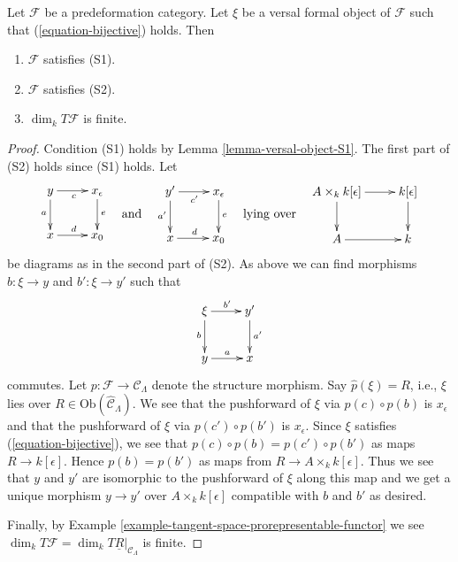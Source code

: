 \begin{lemma}
\label{lemma-miniversal-object-existence-1}
Let $\mathcal{F}$ be a predeformation category.
Let $\xi$ be a versal formal object of $\mathcal{F}$ such that
(\ref{equation-bijective}) holds. Then
\begin{enumerate}
\item $\mathcal{F}$ satisfies (S1).
\item $\mathcal{F}$ satisfies (S2).
\item $\dim_{k} T\mathcal{F}$ is finite.
\end{enumerate}
\end{lemma}

\begin{proof}
Condition (S1) holds by
Lemma \ref{lemma-versal-object-S1}.
The first part of (S2) holds since (S1) holds. Let
$$
\vcenter{
\xymatrix{
y \ar[r]_c \ar[d]_a & x_\epsilon \ar[d]^e \\
x \ar[r]^d          & x_0
}
}
\quad\text{and}\quad
\vcenter{
\xymatrix{
y' \ar[r]_{c'} \ar[d]_{a'} & x_\epsilon \ar[d]^e \\
x \ar[r]^d                 & x_0
}
}
\quad\text{lying over}\quad
\vcenter{
\xymatrix{
A \times_{k} k[\epsilon] \ar[r] \ar[d] & k[\epsilon] \ar[d] \\
A  \ar[r] & k 
}
}
$$
be diagrams as in the second part of (S2). As above we can find
morphisms $b : \xi \to y$ and $b' : \xi \to y'$ such that
$$
\xymatrix{
\xi \ar[r]^{b'} \ar[d]_{b}          & y' \ar[d]^{a'} \\
y \ar[r]^{a} & x   
}
$$
commutes. Let $p : \mathcal{F} \to \mathcal{C}_\Lambda$ denote the 
structure morphism. Say $\widehat{p}(\xi) = R$, i.e., $\xi$ lies over
$R \in \text{Ob}(\widehat{\mathcal{C}}_\Lambda)$. We see that the
pushforward of $\xi$ via $p(c) \circ p(b)$ is $x_\epsilon$
and that the pushforward of $\xi$ via $p(c') \circ p(b')$ is $x_\epsilon$.
Since $\xi$ satisfies (\ref{equation-bijective}), we see that
$p(c) \circ p(b) = p(c') \circ p(b')$
as maps $R \to k[\epsilon]$. Hence $p(b) = p(b')$ as maps from
$R \to A \times_k k[\epsilon]$. Thus we see that $y$ and $y'$ are
isomorphic to the pushforward of $\xi$ along this map and we get
a unique morphism $y \to y'$ over $A \times_k k[\epsilon]$
compatible with $b$ and $b'$ as desired.

\medskip\noindent
Finally, by
Example \ref{example-tangent-space-prorepresentable-functor}
we see
$\dim_{k} T\mathcal{F} = \dim_{k} T\underline{R}|_{\mathcal{C}_\Lambda}$
is finite.
\end{proof}

